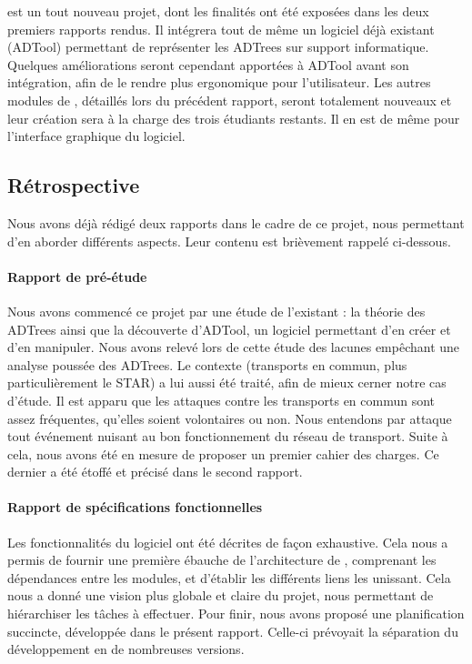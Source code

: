 	\glasir{} est un tout nouveau projet, dont les finalités ont été exposées dans les deux premiers rapports rendus. Il intégrera tout de même un logiciel déjà existant (ADTool) permettant de représenter les ADTrees sur support informatique. Quelques améliorations seront cependant apportées à ADTool avant son intégration, afin de le rendre plus ergonomique pour l'utilisateur. Les autres modules de \glasir{}, détaillés lors du précédent rapport, seront totalement nouveaux et leur création sera à la charge des trois étudiants restants. Il en est de même pour l'interface graphique du logiciel.

	\subsection{Rétrospective}

	Nous avons déjà rédigé deux rapports dans le cadre de ce projet, nous permettant d'en aborder différents aspects. Leur contenu est brièvement rappelé ci-dessous.

	\paragraph{Rapport de pré-étude} Nous avons commencé ce projet par une étude de l'existant : la théorie des ADTrees ainsi que la découverte d'ADTool, un logiciel permettant d'en créer et d'en manipuler. Nous avons relevé lors de cette étude des lacunes empêchant une analyse poussée des ADTrees. Le contexte (transports en commun, plus particulièrement le STAR) a lui aussi été traité, afin de mieux cerner notre cas d'étude. Il est apparu que les attaques contre les transports en commun sont assez fréquentes, qu'elles soient volontaires ou non. Nous entendons par \og attaque \fg{} tout événement nuisant au bon fonctionnement du réseau de transport. Suite à cela, nous avons été en mesure de proposer un premier cahier des charges. Ce dernier a été étoffé et précisé dans le second rapport.

	\paragraph{Rapport de spécifications fonctionnelles} Les fonctionnalités du logiciel ont été décrites de façon exhaustive. Cela nous a permis de fournir une première ébauche de l'architecture de \glasir{}, comprenant les dépendances entre les modules, et d'établir les différents liens les unissant. Cela nous a donné une vision plus globale et claire du projet, nous permettant de hiérarchiser les tâches à effectuer. Pour finir, nous avons proposé une planification succincte, développée dans le présent rapport. Celle-ci prévoyait la séparation du développement en de nombreuses versions.

